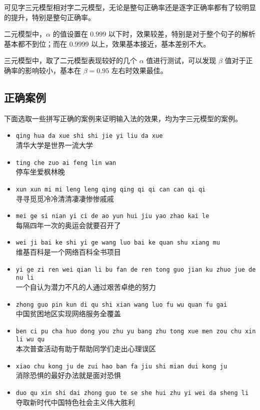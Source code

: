 \documentclass[a4paper]{article}
\begin{document}
    可见字三元模型相对字二元模型，无论是整句正确率还是逐字正确率都有了较明显的提升，特别是整句正确率。

    二元模型中，$\alpha$ 的值设置在 $0.999$ 以下时，效果较差，特别是对于整个句子的解析基本都不到位；而在 $0.9999$ 以上，效果基本接近，基本差别不大。

    三元模型中，取了二元模型表现较好的几个 $\alpha$ 值进行测试，可以发现 $\beta$ 值对于正确率的影响较小，基本在 $\beta = 0.95$ 左右时效果最佳。

    \subsection{正确案例}

    下面选取一些拼写正确的案例来证明输入法的效果，均为字三元模型的案例。

    \begin{itemize}
        \item \texttt{qing hua da xue shi shi jie yi liu da xue} \\
        清华大学是世界一流大学
        \item \texttt{ting che zuo ai feng lin wan} \\
        停车坐爱枫林晚
        \item \texttt{xun xun mi mi leng leng qing qing qi qi can can qi qi} \\
        寻寻觅觅冷冷清清凄凄惨惨戚戚
        \item \texttt{mei ge si nian yi ci de ao yun hui jiu yao zhao kai le} \\
        每隔四年一次的奥运会就要召开了
        \item \texttt{wei ji bai ke shi yi ge wang luo bai ke quan shu xiang mu} \\
        维基百科是一个网络百科全书项目
        \item \texttt{yi ge zi ren wei qian li bu fan de ren tong guo jian ku zhuo jue de nu li} \\
        一个自认为潜力不凡的人通过艰苦卓绝的努力
        \item \texttt{zhong guo pin kun di qu shi xian wang luo fu wu quan fu gai} \\
        中国贫困地区实现网络服务全覆盖
        \item \texttt{ben ci pu cha huo dong you zhu yu bang zhu tong xue men zou chu xin li wu qu} \\
        本次普查活动有助于帮助同学们走出心理误区
        \item \texttt{xiao chu kong ju de zui hao ban fa jiu shi mian dui kong ju} \\
        消除恐惧的最好办法就是面对恐惧
        \item \texttt{duo qu xin shi dai zhong guo te se she hui zhu yi wei da sheng li} \\
        夺取新时代中国特色社会主义伟大胜利
    \end{itemize}
\end{document}
